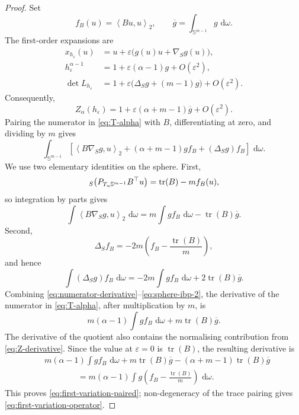 \documentclass[10pt,a4paper]{amsart}
\DeclareMathOperator{\tr}{tr}
\let\div\relax
\newcommand{\dd}{\,\mathrm{d}}
\newcommand{\ip}[2]{\left\langle #1,#2\right\rangle_2}
\newcommand{\sphere}{\mathbb{S}}
\begin{document}
\begin{proof}
Set
\[
f_B(u)=\ip{Bu}{u},
\qquad
\overline g=\int_{\sphere^{m-1}}g\,\dd\omega.
\]
The first-order expansions are
\begin{align*}
x_{h_\varepsilon}(u)
&=u+\varepsilon\big(g(u)u+\nabla_Sg(u)\big),\\
h_\varepsilon^{\alpha-1}
&=1+\varepsilon(\alpha-1)g+O(\varepsilon^2),\\
\det L_{h_\varepsilon}
&=1+\varepsilon\big(\Delta_Sg+(m-1)g\big)+O(\varepsilon^2).
\end{align*}
Consequently,
\begin{equation}\label{eq:Z-derivative}
Z_\alpha(h_\varepsilon)
=1+\varepsilon(\alpha+m-1)\overline g+O(\varepsilon^2).
\end{equation}
Pairing the numerator in \eqref{eq:T-alpha} with $B$, differentiating at zero, and dividing by $m$ gives
\begin{equation}\label{eq:numerator-derivative}
\int_{\sphere^{m-1}}
\left[
\ip{B\nabla_Sg}{u}
+(\alpha+m-1)gf_B
+(\Delta_Sg)f_B
\right]\,\dd\omega.
\end{equation}
We use two elementary identities on the sphere. First,
\[
\div_S\big(P_{T_u\sphere^{m-1}}B^\top u\big)
=\tr(B)-mf_B(u),
\]
so integration by parts gives
\begin{equation}\label{eq:sphere-ibp-1}
\int\ip{B\nabla_Sg}{u}\,\dd\omega
=m\int gf_B\,\dd\omega-\tr(B)\overline g.
\end{equation}
Second,
\[
\Delta_Sf_B=-2m\left(f_B-\frac{\tr(B)}m\right),
\]
and hence
\begin{equation}\label{eq:sphere-ibp-2}
\int(\Delta_Sg)f_B\,\dd\omega
=-2m\int gf_B\,\dd\omega+2\tr(B)\overline g.
\end{equation}
Combining \eqref{eq:numerator-derivative}--\eqref{eq:sphere-ibp-2}, the derivative of the numerator in \eqref{eq:T-alpha}, after multiplication by $m$, is
\[
m(\alpha-1)\int gf_B\,\dd\omega+m\tr(B)\overline g.
\]
The derivative of the quotient also contains the normalising contribution from \eqref{eq:Z-derivative}. Since the value at $\varepsilon=0$ is $\tr(B)$, the resulting derivative is
\begin{align*}
&m(\alpha-1)\int gf_B\,\dd\omega
+m\tr(B)\overline g
-(\alpha+m-1)\tr(B)\overline g\\
&\hspace{4em}=m(\alpha-1)\int g\left(f_B-\frac{\tr(B)}m\right)\,\dd\omega.
\end{align*}
This proves \eqref{eq:first-variation-paired}; non-degeneracy of the trace pairing gives \eqref{eq:first-variation-operator}.
\end{proof}
\end{document}
